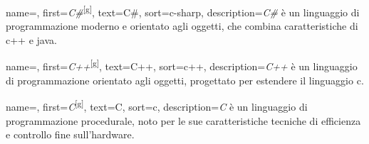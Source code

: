  {
    name=,
    first={\textit{C\#}\textsuperscript{[g]}},
    text=C\#,
    sort=c-sharp,
    description={\textit{C\#} è un linguaggio di programmazione moderno e orientato agli oggetti, che combina caratteristiche di \gls{c++} e \gls{java}.}
}

 {
    name=,
    first={\textit{C++}\textsuperscript{[g]}},
    text=C++,
    sort=c++,
    description={\textit{C++} è un linguaggio di programmazione orientato agli oggetti, progettato per estendere il linguaggio \gls{c}.}
}

 {
    name=,
    first={\textit{C}\textsuperscript{[g]}},
    text=C,
    sort=c,
    description={\textit{C} è un linguaggio di programmazione procedurale, noto per le sue caratteristiche tecniche di efficienza e controllo fine sull’hardware.}
}

